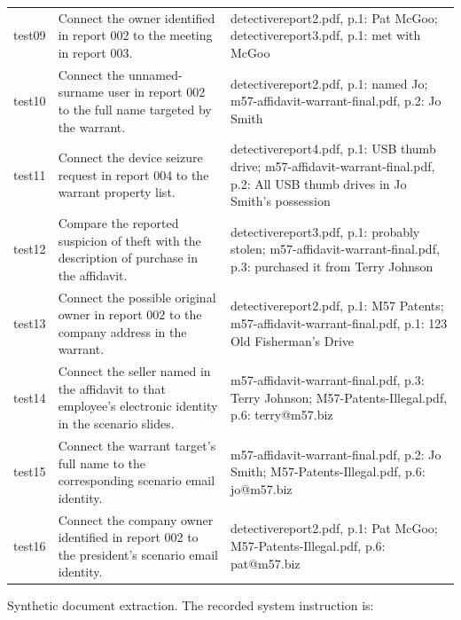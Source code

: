 \begin{table}[t]
\begin{tabular}{p{}p{}p{}}
test09 & Connect the owner identified in report 002 to the meeting in report 003. & detectivereport2.pdf, p.1: Pat McGoo; detectivereport3.pdf, p.1: met with McGoo\\

test10 & Connect the unnamed-surname user in report 002 to the full name targeted by the warrant. & detectivereport2.pdf, p.1: named Jo; m57-affidavit-warrant-final.pdf, p.2: Jo Smith\\

test11 & Connect the device seizure request in report 004 to the warrant property list. & detectivereport4.pdf, p.1: USB thumb drive; m57-affidavit-warrant-final.pdf, p.2: All USB thumb drives in Jo Smith's possession\\

test12 & Compare the reported suspicion of theft with the description of purchase in the affidavit. & detectivereport3.pdf, p.1: probably stolen; m57-affidavit-warrant-final.pdf, p.3: purchased it from Terry Johnson\\

test13 & Connect the possible original owner in report 002 to the company address in the warrant. & detectivereport2.pdf, p.1: M57 Patents; m57-affidavit-warrant-final.pdf, p.1: 123 Old Fisherman's Drive\\

test14 & Connect the seller named in the affidavit to that employee's electronic identity in the scenario slides. & m57-affidavit-warrant-final.pdf, p.3: Terry Johnson; M57-Patents-Illegal.pdf, p.6: terry@m57.biz\\

test15 & Connect the warrant target's full name to the corresponding scenario email identity. & m57-affidavit-warrant-final.pdf, p.2: Jo Smith; M57-Patents-Illegal.pdf, p.6: jo@m57.biz\\

test16 & Connect the company owner identified in report 002 to the president's scenario email identity. & detectivereport2.pdf, p.1: Pat McGoo; M57-Patents-Illegal.pdf, p.6: pat@m57.biz\\

\bottomrule\end{tabular}\end{table}

Synthetic document extraction. The recorded system instruction is:

